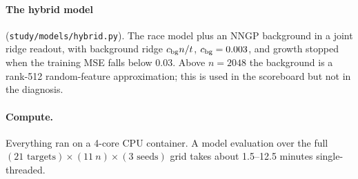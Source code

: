 \paragraph{The hybrid model} (\texttt{study/models/hybrid.py}). The race model plus an NNGP background in a joint ridge readout, with background ridge $c_{\rm bg}n/t$, $c_{\rm bg}=0.003$, and growth stopped when the training MSE falls below $0.03$. Above $n=2048$ the background is a rank-512 random-feature approximation; this is used in the scoreboard but not in the diagnosis.

\paragraph{Compute.} Everything ran on a 4-core CPU container. A model evaluation over the full $(21\text{ targets})\times(11\ n)\times(3\text{ seeds})$ grid takes about 1.5–12.5 minutes single-threaded.
